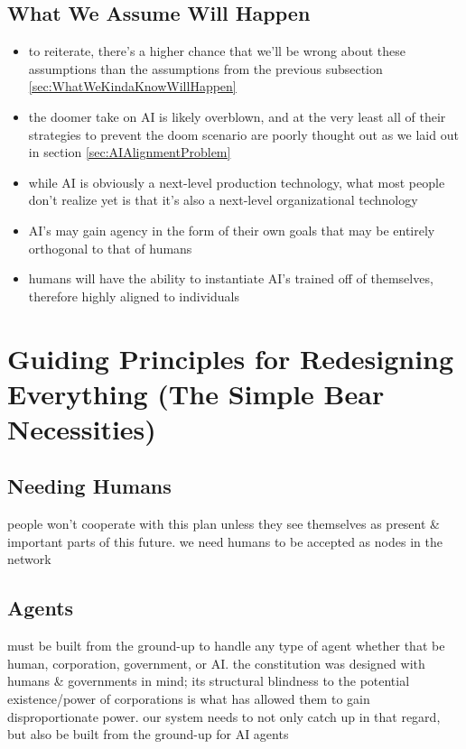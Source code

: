 \documentclass{article}
\begin{document}
\subsection{What We Assume Will Happen}
\label{sec:WhatWeAssumeWillHappen}
\begin{itemize}
    \item to reiterate, there's a higher chance that we'll be wrong about these assumptions than the assumptions from the previous subsection \ref{sec:WhatWeKindaKnowWillHappen}
    \item the doomer take on AI is likely overblown, and at the very least all of their strategies to prevent the doom scenario are poorly thought out as we laid out in section \ref{sec:AIAlignmentProblem}
    \item while AI is obviously a next-level production technology, what most people don't realize yet is that it's also a next-level organizational technology
    \item AI's may gain agency in the form of their own goals that may be entirely orthogonal to that of humans
    \item humans will have the ability to instantiate AI's trained off of themselves, therefore highly aligned to individuals
\end{itemize}






\section{Guiding Principles for Redesigning Everything (The Simple Bear Necessities)}
\label{sec:GuidingPrinciplesRedesigningEverything}

\subsection{Needing Humans}
people won't cooperate with this plan unless they see themselves as present \& important parts of this future. we need humans to be accepted as nodes in the network

\subsection{Agents}
must be built from the ground-up to handle any type of agent whether that be human, corporation, government, or AI. the constitution was designed with humans \& governments in mind; its structural blindness to the potential existence/power of corporations is what has allowed them to gain disproportionate power. our system needs to not only catch up in that regard, but also be built from the ground-up for AI agents
\end{document}
